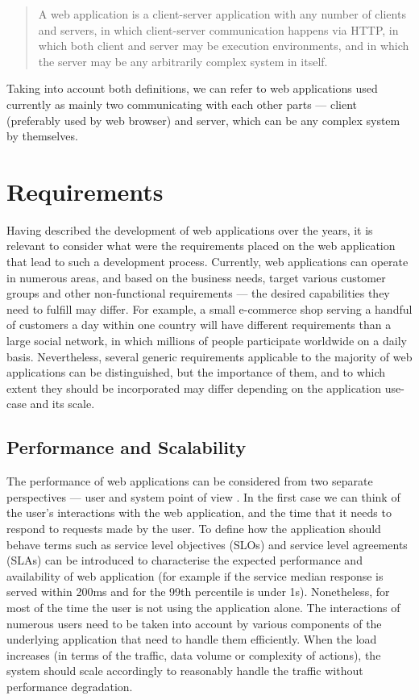 \begin{quotation}
A web application is a client-server application with any number of clients and servers, in which client-server communication happens via HTTP, in which both client and server may be execution environments, and in which the server may be any arbitrarily complex system in itself.
\end{quotation}

Taking into account both definitions, we can refer to web applications used currently as mainly two communicating with each other parts --- client (preferably used by web browser) and server, which can be any complex system by themselves.

\section{Requirements}

Having described the development of web applications over the years, it is relevant to consider what were the requirements placed on the web application that lead to such a development process. Currently, web applications can operate in numerous areas, and based on the business needs, target various customer groups and other non-functional requirements --- the desired capabilities they need to fulfill may differ. For example, a small e-commerce shop serving a handful of customers a day within one country will have different requirements than a large social network, in which millions of people participate worldwide on a daily basis. Nevertheless, several generic requirements applicable to the majority of web applications can be distinguished, but the importance of them, and to which extent they should be incorporated may differ depending on the application use-case and its scale.

\subsection*{Performance and Scalability}

The performance of web applications can be considered from two separate perspectives --- user and system point of view \cite{DesignDataIntensiveApplications}. In the first case we can think of the user's interactions with the web application, and the time that it needs to respond to requests made by the user. To define how the application should behave terms such as service level objectives (SLOs) and service level agreements (SLAs) can be introduced to characterise the expected performance and availability of web application (for example if the service median response is served within 200ms and for the 99th percentile is under 1s). Nonetheless, for most of the time the user is not using the application alone. The interactions of numerous users need to be taken into account by various components of the underlying application that need to handle them efficiently. When the load increases (in terms of the traffic, data volume or complexity of actions), the system should scale accordingly to reasonably handle the traffic without performance degradation. 


